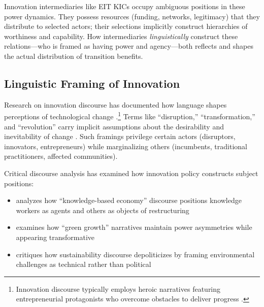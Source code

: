 \documentclass[../main.tex]{subfiles}
\begin{document}
Innovation intermediaries like EIT KICs occupy ambiguous positions in these power dynamics. They possess resources (funding, networks, legitimacy) that they distribute to selected actors; their selections implicitly construct hierarchies of worthiness and capability. How intermediaries \textit{linguistically} construct these relations---who is framed as having power and agency---both reflects and shapes the actual distribution of transition benefits.

\subsection{Linguistic Framing of Innovation}

Research on innovation discourse has documented how language shapes perceptions of technological change \cite{lakoff1980metaphors}.\footnote{Innovation discourse typically employs heroic narratives featuring entrepreneurial protagonists who overcome obstacles to deliver progress \cite{pfotenhauer2019politics}.} Terms like ``disruption,'' ``transformation,'' and ``revolution'' carry implicit assumptions about the desirability and inevitability of change \cite{vinsel2021innovation,godin2015innovation}. Such framings privilege certain actors (disruptors, innovators, entrepreneurs) while marginalizing others (incumbents, traditional practitioners, affected communities).

Critical discourse analysis has examined how innovation policy constructs subject positions:

\begin{itemize}
    \item \cite{jessop2013cultural} analyzes how ``knowledge-based economy'' discourse positions knowledge workers as agents and others as objects of restructuring
    \item \cite{tyfield2012transition} examines how ``green growth'' narratives maintain power asymmetries while appearing transformative
    \item \cite{swyngedouw2010impossible} critiques how sustainability discourse depoliticizes by framing environmental challenges as technical rather than political
\end{itemize}
\end{document}

